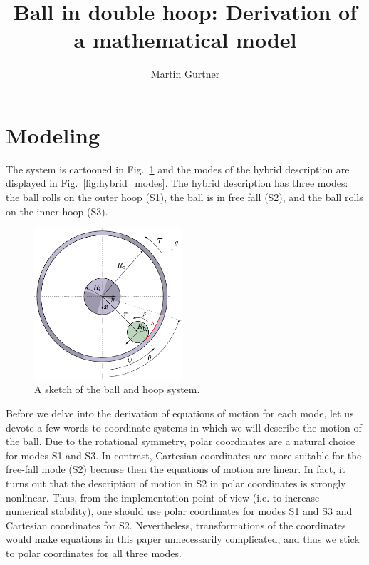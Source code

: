 \documentclass{ifacconf}
\begin{document}
\begin{frontmatter}

\title{Ball in double hoop: Derivation of a mathematical model} 

\author{Martin Gurtner\quad} 


\end{frontmatter}

\section{Modeling} %
\label{sec:model}
The system is cartooned in Fig.~\ref{fig:model_sketch} and the modes of the hybrid description are displayed in Fig.~\ref{fig:hybrid_modes}. The hybrid description has three modes: the ball rolls on the outer hoop (S1), the ball is in free fall (S2), and the ball rolls on the inner hoop (S3).

\begin{figure}[b]
\begin{center}
\includegraphics[width=5.5cm]{figs/sketchOfBallInAHoop3}    %
\caption{A sketch of the ball and hoop system.}
\label{fig:model_sketch}
\end{center}
\end{figure}

Before we delve into the derivation of equations of motion for each mode, let us devote a few words to coordinate systems in which we will describe the motion of the ball. Due to the rotational symmetry, polar coordinates are a natural choice for modes S1 and S3. In contrast, Cartesian coordinates are more suitable for the free-fall mode (S2) because then the equations of motion are linear. In fact, it turns out that the description of motion in S2 in polar coordinates is strongly nonlinear. Thus, from the implementation point of view (i.e. to increase numerical stability), one should use polar coordinates for modes S1 and S3 and Cartesian coordinates for S2. Nevertheless, transformations of the coordinates would make equations in this paper unnecessarily complicated, and thus we stick to polar coordinates for all three modes.
\end{document}

